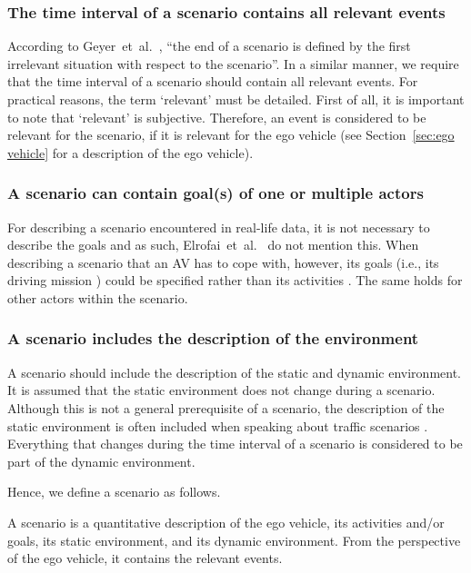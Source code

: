 \subsubsection{The time interval of a scenario contains all relevant events}
According to Geyer~et~al.~\cite{geyer2014}, ``the end of a scenario is defined by the first irrelevant situation with respect to the scenario''. In a similar manner, we require that the time interval of a scenario should contain all relevant events. For practical reasons, the term `relevant' must be detailed. First of all, it is important to note that `relevant' is subjective. Therefore, an event is considered to be relevant for the scenario, if it is relevant for the ego vehicle (see Section~\ref{sec:ego vehicle} for a description of the ego vehicle).

\subsubsection{A scenario can contain goal(s) of one or multiple actors}
For describing a scenario encountered in real-life data, it is not necessary to describe the goals and as such, Elrofai~et~al.~\cite{elrofai2016scenario} do not mention this. When describing a scenario that an AV has to cope with, however, its goals (i.e., its driving mission \cite{geyer2014}) could be specified rather than its activities \cite{ulbrich2015}. The same holds for other actors within the scenario.
	
\subsubsection{A scenario includes the description of the environment}
A scenario should include the description of the static and dynamic environment. It is assumed that the static environment does not change during a scenario. Although this is not a general prerequisite of a scenario, the description of the static environment is often included when speaking about traffic scenarios \cite{geyer2014, ulbrich2015, elrofai2016scenario, ebner2011identifying, schuldt2013effiziente, althoff2017CommonRoad}. Everything that changes during the time interval of a scenario is considered to be part of the dynamic environment. 

Hence, we define a scenario as follows.
\begin{definition}[Scenario]\label{def:scenario}
	A scenario is a quantitative description of the ego vehicle, its activities and/or goals, its static environment, and its dynamic environment. From the perspective of the ego vehicle, it contains the relevant events.
\end{definition}

